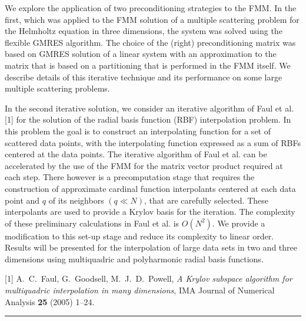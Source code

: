 \documentclass[twosided]{report}
\begin{document}
We
explore the application of two preconditioning strategies to
the FMM. In the first, which was applied to the FMM solution
of a multiple scattering problem for the Helmholtz equation
in three dimensions, the system was solved using the
flexible GMRES algorithm. The choice of the (right)
preconditioning matrix was based on GMRES solution of a
linear system with an approximation to the matrix that is
based on a partitioning that is performed in the FMM itself.
We describe details of this iterative technique and its
performance on some large multiple scattering problems.


In the second iterative solution, we consider an iterative
algorithm of Faul et al. [1] for the solution of the
radial basis function (RBF) interpolation problem. In this
problem the goal is to construct an interpolating function
for a set of scattered data points, with the interpolating
function expressed as a sum of RBFs centered at the data
points. The iterative algorithm of Faul et al. can be
accelerated by the use of the FMM for the matrix vector
product required at each step. There however is a
precomputation stage that requires the construction of
approximate cardinal function interpolants centered at each
data point and $q$ of its neighbors $(q\ll N)$, that are
carefully selected. These interpolants are used to provide a
Krylov basis for the iteration. The complexity of these
preliminary calculations in Faul et al. is $O(N^2)$.
We provide a modification to this set-up stage and reduce
its complexity to linear order. Results will be presented
for the interpolation of large data sets in two and three
dimensions using multiquadric and polyharmonic radial basis
functions.

[1] A.~C.~Faul, G.~Goodsell, M.~J.~D.~Powell,
{\em A Krylov subspace algorithm for multiquadric interpolation
in many dimensions}, IMA Journal of Numerical Analysis
{\bf 25} (2005) 1--24.



	\begin{center} \rule{6in}{1pt} \end{center}
\end{document}
